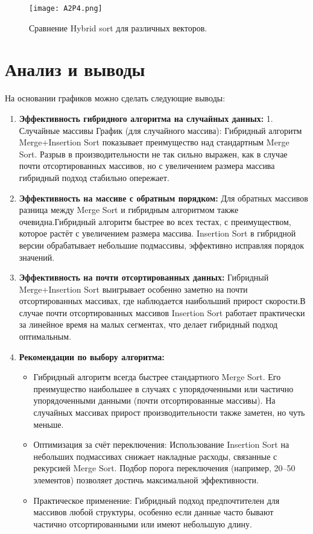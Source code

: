 \documentclass{article}
\begin{document}
\begin{figure}[h!]
    \centering
    \texttt{[image: A2P4.png]}
    \caption{Сравнение Hybrid sort для различных векторов.}
\end{figure}

\section{Анализ и выводы}

На основании графиков можно сделать следующие выводы:

\begin{enumerate}
    \item \textbf{Эффективность гибридного алгоритма на случайных данных:} 
    1. Случайные массивы
График (для случайного массива):
Гибридный алгоритм Merge+Insertion Sort показывает преимущество над стандартным Merge Sort. Разрыв в производительности не так сильно выражен, как в случае почти отсортированных массивов, но с увеличением размера массива гибридный подход стабильно опережает.
    
    \item \textbf{Эффективность на массиве с обратным порядком:} 
    Для обратных массивов разница между Merge Sort и гибридным алгоритмом также очевидна.Гибридный алгоритм быстрее во всех тестах, с преимуществом, которое растёт с увеличением размера массива.
Insertion Sort в гибридной версии обрабатывает небольшие подмассивы, эффективно исправляя порядок значений.

    \item \textbf{Эффективность на почти отсортированных данных:}
    Гибридный Merge+Insertion Sort выигрывает особенно заметно на почти отсортированных массивах, где наблюдается наибольший прирост скорости.В случае почти отсортированных массивов Insertion Sort работает практически за линейное время на малых сегментах, что делает гибридный подход оптимальным.

    \item \textbf{Рекомендации по выбору алгоритма:}
    \begin{itemize}
        \item Гибридный алгоритм всегда быстрее стандартного Merge Sort.
Его преимущество наибольшее в случаях с упорядоченными или частично упорядоченными данными (почти отсортированные массивы). На случайных массивах прирост производительности также заметен, но чуть меньше.
        \item Оптимизация за счёт переключения:
Использование Insertion Sort на небольших подмассивах снижает накладные расходы, связанные с рекурсией Merge Sort. Подбор порога переключения (например, 20–50 элементов) позволяет достичь максимальной эффективности.
        \item Практическое применение:
Гибридный подход предпочтителен для массивов любой структуры, особенно если данные часто бывают частично отсортированными или имеют небольшую длину.
    \end{itemize}
\end{enumerate}
\end{document}
